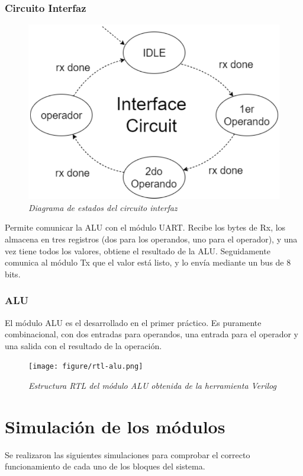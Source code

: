 \documentclass[12pt,A4paper,titlepage]{article}
\begin{document}
\subsubsection{Circuito Interfaz}
\begin{figure}[H] 
	\centering
	\includegraphics[scale=0.6]{figure/estados_IC.png}
	\caption{\textit{Diagrama de estados del circuito interfaz}}
\end{figure}
Permite comunicar la ALU con el módulo UART. Recibe los bytes de Rx, los almacena en tres registros (dos para los operandos, uno para el operador), y una vez tiene todos los valores, obtiene el resultado de la ALU. Seguidamente comunica al módulo Tx que el valor está listo, y lo envía mediante un bus de 8 bits.

\newpage
\subsubsection{ALU}
El módulo ALU es el desarrollado en el primer práctico. Es puramente combinacional, con dos entradas para operandos, una entrada para el operador y una salida con el resultado de la operación.

\begin{figure}[h] 
	\centering
	\texttt{[image: figure/rtl-alu.png]}
	\caption{\textit{Estructura RTL del módulo ALU obtenida de la herramienta Verilog}}
\end{figure}


\section{Simulación de los módulos}
Se realizaron las siguientes simulaciones para comprobar el correcto funcionamiento de cada uno de los bloques del sistema.
\end{document}
